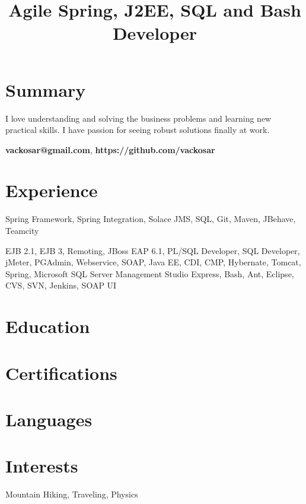 \documentclass[11pt,a4paper,sans]{moderncv} %
\title{Agile Spring, J2EE, SQL and Bash Developer}
\begin{document}
\makecvtitle %

\section{Summary}
I love understanding and solving the business problems and learning new practical skills. I have passion for seeing robust solutions finally at work.
\begin{flushright} \textbf{vackosar@gmail.com}, \textbf{https://github.com/vackosar} \end{flushright}


\section{Experience}
Spring Framework, Spring Integration, Solace JMS, SQL, Git, Maven, JBehave, Teamcity\par
{}
EJB 2.1, EJB 3, Remoting, JBoss EAP 6.1, PL/SQL Developer, SQL Developer, jMeter, PGAdmin, Webservice, SOAP, Java EE, CDI, CMP, Hybernate, Tomcat, Spring, Microsoft SQL Server Management Studio Express, Bash, Ant, Eclipse, CVS, SVN, Jenkins, SOAP UI\par
{}

\section{Education}


\section{Certifications}

\section{Languages}

\section{Interests}
Mountain Hiking, Traveling, Physics


\end{document}
